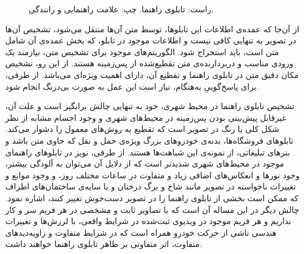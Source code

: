 \documentclass[12pt,a4paper]{article}
\theoremstyle{definition}
\theoremstyle{theorem}
\theoremstyle{definition}
\begin{document}
\begin{figure}[t]
\centering
{}
\hspace{3mm}
\caption{
راست: تابلوی راهنما\cite{masjedJame}. چپ: علامت راهنمایی و رانندگی\cite{signPic}. }
\label{sign-pic}
\end{figure}

از آن‌جا که عمده‌ی اطلاعات این تابلوها، توسط متن‌ آن‌ها منتقل می‌شود، تشخیص آن‌ها در تصویر به تنهایی کافی نیست و اطلاعات موجود در تابلو، که بخش عمده‌ی آن شامل متن است، باید استخراج شود. الگوریتم‌های موجود برای تشخیص متن، نیازمند یک ورودی مناسب و دربردارنده‌ی متن تقطیع‌شده از پس‌زمینه هستند. از این رو، تشخیص مکان دقیق متن در تابلوی راهنما و تقطیع آن، دارای اهمیت ویژه‌ای می‌باشد. از طرفی، برای پاسخ‌گوییِ به‌هنگام، نیاز است این عمل به صورت بی‌درنگ انجام شود.

تشخیص تابلوی راهنما در محیط شهری، خود به تنهایی چالش برانگیز است و علت آن، غیرقابل پیش‌بینی بودن پس‌زمینه در محیط‌های شهری و وجود اجسام مشابه از نظر شکل کلی یا رنگ در تصویر است که تقطیع به روش‌های معمول را دشوار می‌کند. تابلوهای فروشگاه‌ها، بدنه‌ی خودروهای بزرگ‌ ویژه‌ی حمل و نقل که حاوی متن باشد و بنرهای تبلیغاتی، از نمونه‌ی این شباهت‌ها هستند. از طرفی، نویز در تابلوهای راهنمای موجود در محیط‌های شهری شدیدتر است که از دلایل آن می‌توان به آلودگی بیشتر، وجود نورها و انعکاس‌های اضافی زیاد و متفاوت در ساعات مختلف روز، و وجود موانع و تغییرات ناخواسته در تصویر مانند شاخ و برگ درختان و یا سایه‌ی ساختمان‌های اطراف که ممکن است بخشی از تابلوی راهنما را در تصویر دست‌خوش تغییر کنند، اشاره نمود. چالش دیگر در این مساله آن است که با تصاویر ثابت و مشخصی در هر فریم سر و کار نداریم و هر فریم موجود در ویدیوی ثبت‌شده در شرایط واقعی، با لرزش‌ها و تغییرات هندسی ناشی از حرکت خودرو همراه است که در شرایط متفاوت و زاویه‌دید‌های متفاوت، اثر متفاوتی بر ظاهر تابلوی راهنما خواهند داشت.
\end{document}

